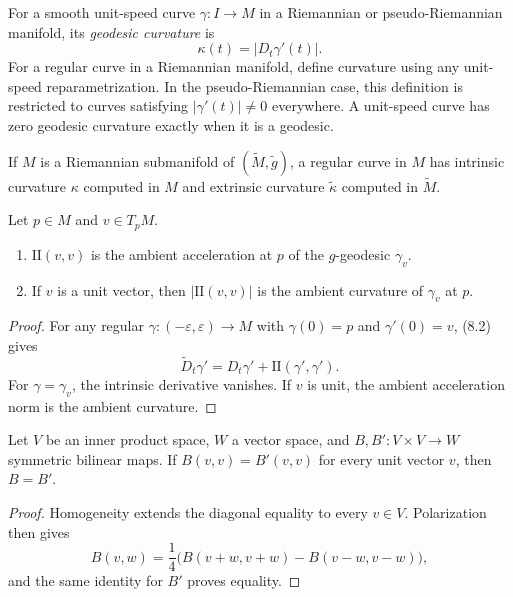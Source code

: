 For a smooth unit-speed curve $\gamma:I\to M$ in a Riemannian or
pseudo-Riemannian manifold, its \emph{geodesic curvature} is
\[
\kappa(t)=|D_t\gamma'(t)|.
\]
For a regular curve in a Riemannian manifold, define curvature using any
unit-speed reparametrization. In the pseudo-Riemannian case, this definition
is restricted to curves satisfying $|\gamma'(t)|\neq0$ everywhere. A
unit-speed curve has zero geodesic curvature exactly when it is a geodesic.

If $M$ is a Riemannian submanifold of
$(\widetilde M,\widetilde g)$, a regular curve in $M$ has intrinsic curvature
$\kappa$ computed in $M$ and extrinsic curvature $\widetilde\kappa$ computed
in $\widetilde M$.

\begin{proposition}
\label{prop:geometric-interpretation-ii}


Let $p\in M$ and $v\in T_pM$.
\begin{enumerate}
\item[(a)] $\mathrm{II}(v,v)$ is the ambient acceleration at $p$ of the
$g$-geodesic $\gamma_v$.
\item[(b)] If $v$ is a unit vector, then $|\mathrm{II}(v,v)|$ is the ambient
curvature of $\gamma_v$ at $p$.
\end{enumerate}
\end{proposition}

\begin{proof}
\sketch For any regular $\gamma:(-\varepsilon,\varepsilon)\to M$ with
$\gamma(0)=p$ and $\gamma'(0)=v$, (8.2) gives
\[
\widetilde D_t\gamma'
=D_t\gamma'+\mathrm{II}(\gamma',\gamma').
\]
For $\gamma=\gamma_v$, the intrinsic derivative vanishes. If $v$ is unit,
the ambient acceleration norm is the ambient curvature.
\end{proof}

\begin{lemma}
\label{lem:symmetric-bilinear-form-unit-vectors}

Let $V$ be an inner product space, $W$ a vector space, and
$B,B':V\times V\to W$ symmetric bilinear maps. If
$B(v,v)=B'(v,v)$ for every unit vector $v$, then $B=B'$.
\end{lemma}

\begin{proof}
\sketch Homogeneity extends the diagonal equality to every $v\in V$.
Polarization then gives
\[
B(v,w)=\frac14\bigl(B(v+w,v+w)-B(v-w,v-w)\bigr),
\]
and the same identity for $B'$ proves equality.
\end{proof}

